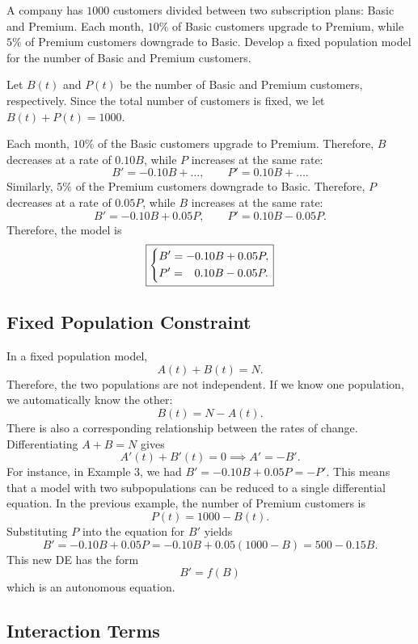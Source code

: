 \documentclass[09pt,letterpaper]{article}
\begin{document}

\begin{example}[4]{
A company has $1000$ customers divided between two subscription plans:
Basic and Premium. Each month, $10\%$ of Basic customers upgrade to Premium,
while $5\%$ of Premium customers downgrade to Basic. Develop a fixed population model for
the number of Basic and Premium customers.
}

Let $B(t)$ and $P(t)$ be the number of Basic and Premium customers, respectively.
Since the total number of customers is fixed, we let $B(t)+P(t)=1000$. 

Each month, $10\%$ of the Basic customers upgrade to Premium. Therefore,
$B$ decreases at a rate of $0.10B$, while $P$ increases at the same rate:
\[
B'=-0.10B+\ldots,
\qquad
P'=0.10B+\ldots.
\]
Similarly, $5\%$ of the Premium customers downgrade to Basic. Therefore,
$P$ decreases at a rate of $0.05P$, while $B$ increases at the same rate:
\[
B'=-0.10B+0.05P,
\qquad
P'=0.10B-0.05P.
\]
Therefore, the model is
\[
\boxed{
\begin{dcases}
B'=-0.10B+0.05P,\\
P'=\phantom{-}0.10B-0.05P.
\end{dcases}
}
\]
\end{example}

\subsection{Fixed Population Constraint}

In a fixed population model,
\[
A(t)+B(t)=N.
\]
Therefore, the two populations are not independent. If we know one
population, we automatically know the other:
\[
B(t)=N-A(t).
\]
There is also a corresponding relationship between the rates of change.
Differentiating $A+B=N$ gives
\[
A'(t)+B'(t)=0 \implies A' =-B'.
\]
For instance, in Example 3, we had $B'=-0.10B+0.05P = -P'$.  
This means that a model with two subpopulations can be reduced to a single differential equation. In the previous example, the number of Premium customers is 
\[
P(t)=1000-B(t).
\]
Substituting $P$ into the equation for $B'$ yields 
$$
B'=-0.10B+0.05P =-0.10B+0.05(1000-B)=500-0.15B.
$$
This new DE has the form 
$$
B'=f(B)
$$
which is an autonomous equation.

\subsection{Interaction Terms}
\end{document}
